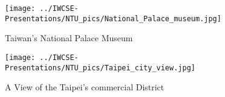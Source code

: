 \begin{frame}
\begin{figure}
 \centering
 \texttt{[image: ../IWCSE-Presentations/NTU\_pics/National\_Palace\_museum.jpg]}
 \caption{Taiwan's National Palace Museum}
 \label{fig:National_Palace_museum}
\end{figure}
\end{frame}

\begin{frame}
\begin{figure}
 \centering
 \texttt{[image: ../IWCSE-Presentations/NTU\_pics/Taipei\_city\_view.jpg]}
 \caption{A View of the Taipei's commercial District}
 \label{fig:Taipei_city_view}
\end{figure}
\end{frame}